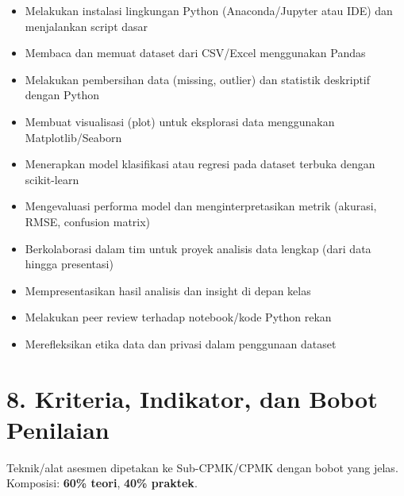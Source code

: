 \documentclass[12pt,a4paper]{article}
\begin{document}
\begin{itemize}[leftmargin=*]
  \item Melakukan instalasi lingkungan Python (Anaconda/Jupyter atau IDE) dan menjalankan script dasar
  \item Membaca dan memuat dataset dari CSV/Excel menggunakan Pandas
  \item Melakukan pembersihan data (missing, outlier) dan statistik deskriptif dengan Python
  \item Membuat visualisasi (plot) untuk eksplorasi data menggunakan Matplotlib/Seaborn
  \item Menerapkan model klasifikasi atau regresi pada dataset terbuka dengan scikit-learn
  \item Mengevaluasi performa model dan menginterpretasikan metrik (akurasi, RMSE, confusion matrix)
  \item Berkolaborasi dalam tim untuk proyek analisis data lengkap (dari data hingga presentasi)
  \item Mempresentasikan hasil analisis dan insight di depan kelas
  \item Melakukan peer review terhadap notebook/kode Python rekan
  \item Merefleksikan etika data dan privasi dalam penggunaan dataset
\end{itemize}

\vspace{0.5cm}

\section*{8. Kriteria, Indikator, dan Bobot Penilaian}

Teknik/alat asesmen dipetakan ke Sub-CPMK/CPMK dengan bobot yang jelas. Komposisi: \textbf{60\% teori}, \textbf{40\% praktek}.
\end{document}
